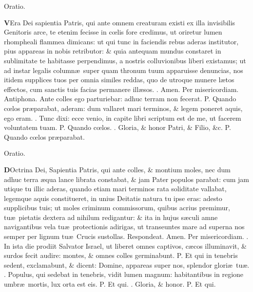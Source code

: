 \documentclass[letter,11pt]{book}
\makeatletter
\DeclareRobustCommand{\Vbar}{\vers@resp{-0.1em}{V}}
\DeclareRobustCommand{\Rbar}{\vers@resp{0pt}{R}}
\newcommand{\vers@resp@sym}{\raisebox{0.2ex}{\rotatebox[origin=c]{-20}{$\m@th\rceil$}}}
\newcommand{\vers@resp}[2]{%
  {\ooalign{\hidewidth\kern#1\vers@resp@sym\hidewidth\cr#2\cr}}%
}%
\def\P{\color{Red} P. \color{black}}
\def\V{\color{Red} \Vbar . \color{black}}
\def\R{\color{Red} \Rbar . \color{black}}
\makeatother
\begin{document}
\begin{multicols*}{2}
\vspace{-.5em} \begin{center} \color{Red} Oratio. \color{black} \end{center} \vspace{-.5em}
\lettrine[lines=2]{\bfseries \color{Red} V}{}Era Dei sapientia Patris, qui ante omnem creaturam existi ex illa
invisibilis Genitoris arce, te etenim fecisse in c\oe lis fore credimus, ut oriretur lumen rhompheali flammea dimicans: ut qui tunc in faciendis rebus aderas institutor, pius appareas in nobis retributor: \& quia antequam mundus constaret in sublimitate te habitasse perpendimus, a nostris colluvionibus liberi existamus; ut ad instar legalis column\ae \ super quam thronum tuum apparuisse denuncias, nos itidem supplices tuos per omnia similes reddas, quo de utroque munere l\ae tos effectos, cum sanctis tuis facias permanere ill\ae sos. \R Amen. Per misericordiam.
\newline \color{Red} Antiphona. \color{black} Ante colles ego parturiebar: adhuc terram non fecerat. \P Quando c\oe los pr\ae parabat, aderam: dum vallaret mari terminos, \& legem poneret aquis, ego eram. \V Tunc dixi: ecce venio, in capite libri scriptum est de me, ut facerem voluntatem tuam. \P Quando c\oe los. \V Gloria, \& honor Patri, \& Filio, \&c. \P Quando c\oe los pr\ae parabat.
\vspace{-.5em} \begin{center} \color{Red} Oratio. \color{black} \end{center} \vspace{-.5em}
\lettrine[lines=2]{\bfseries \color{Red} D}{}Octrina Dei, Sapientia Patris, qui ante colles, \& montium moles, nec dum adhuc terra \ae qua lance librata constabat, \& jam Pater populos parabat: cum jam utique tu illic aderas, quando etiam mari terminos rata soliditate vallabat, legemque aquis constitueret, in unius Deitatis natura tu ipse eras: adesto supplicibus tuis; ut moles criminum commissorum, quibus acrius premimur, tu\ae \ pietatis dextera ad nihilum redigantur: \& ita in hujus s\ae culi amne navigantibus vela tu\ae \ protectionis adirigas, ut transeuntes mare ad superna nos semper per lignum tu\ae \ Crucis sustollas. \color{Red} Respondeat. \color{black} Amen. Per misericordiam.
\newline \R In ista die prodiit Salvator Israel, ut liberet omnes captivos, c\ae cos illuminavit, \& surdos fecit audire: montes, \& omnes colles germinabunt. \P Et qui in tenebris sedent, exclamabunt, \& dicent: Domine, appareas super nos, splendor glori\ae \ tu\ae . \V Populus, qui sedebat in tenebris, vidit lumen magnum: habitantibus in regione umbr\ae \ mortis, lux orta est eis. \P Et qui. \V Gloria, \& honor. \P Et qui.

\end{multicols*}
\end{document}
